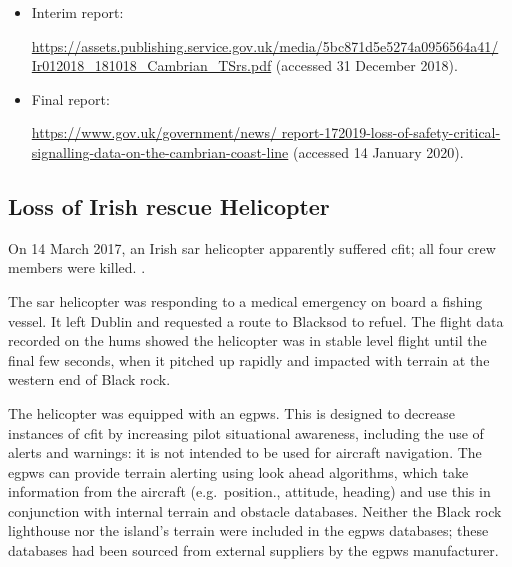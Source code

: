 \begin{samepage}
\begin{itemize}
\item Interim report: \raggedright{\href{https://assets.publishing.service.gov.uk/media/5bc871d5e5274a0956564a41/Ir012018_181018_Cambrian_TSrs.pdf}{https://assets.publishing.service.gov.uk/media/5bc871d5e5274a0956564a41/ Ir012018\_181018\_Cambrian\_TSrs.pdf} (accessed 31 December 2018).}
\item
  Final report: \raggedright{\href{https://www.gov.uk/government/news/report-172019-loss-of-safety-critical-signalling-data-on-the-cambrian-coast-line}{https://www.gov.uk/government/news/ report-172019-loss-of-safety-critical-signalling-data-on-the-cambrian-coast-line} (accessed 14 January 2020).}
\end{itemize}
\end{samepage}

\subsection{Loss of Irish rescue Helicopter} \label{bkm:incacc:irishsar}
On 14 March 2017, an Irish \gls{sar} helicopter apparently suffered \gls{cfit}; all four crew members were killed. .

The \gls{sar} helicopter was responding to a medical emergency on board a fishing vessel. It left Dublin and requested a route to Blacksod to refuel. The flight data recorded on the \gls{hums} showed the helicopter was in stable level flight until the final few seconds, when it pitched up rapidly and impacted with terrain at the western end of Black rock.

The helicopter was equipped with an \gls{egpws}. This is designed to decrease instances of \gls{cfit} by increasing pilot situational awareness, including the use of alerts and warnings: it is not intended to be used for aircraft navigation. The \gls{egpws} can provide terrain alerting using look ahead algorithms, which take information from the aircraft (e.g.\ position., attitude, heading) and use this in conjunction with internal terrain and obstacle \glspl{database}. Neither the Black rock lighthouse nor the island's terrain were included in the \gls{egpws} \glspl{database}; these \glspl{database} had been sourced from external suppliers by the \gls{egpws} manufacturer.

